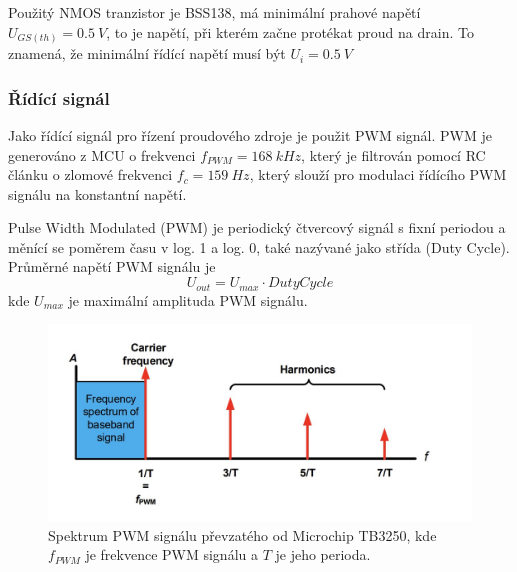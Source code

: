 Použitý NMOS tranzistor je BSS138, má minimální prahové napětí $U_{GS(th)} = 0.5 \ V$, to je napětí, při kterém začne protékat proud na drain. To znamená, že minimální řídící napětí musí být $U_{i} = 0.5 \ V$


\subsubsection{Řídící signál}
Jako řídící signál pro řízení proudového zdroje je použit PWM signál. PWM je generováno z MCU o frekvenci $f_{PWM} = 168 \ kHz$, který je filtrován pomocí RC článku o zlomové frekvenci $f_c = 159 \ Hz$, který slouží pro modulaci řídícího PWM signálu na konstantní napětí.
\par
Pulse Width Modulated (PWM) je periodický čtvercový signál s fixní periodou a měnící se poměrem času v log. 1 a log. 0, také nazývané jako střída (Duty Cycle). Průměrné napětí PWM signálu je
\begin{equation}
    U_{out} = U_{max} \cdot Duty Cycle
\end{equation}
kde $U_{max}$ je maximální amplituda PWM signálu. \par

\begin{figure}[H]
    \centering
    \includegraphics[width=1\linewidth]{pictures/pwm_spectrum_microchip90003250A.jpg}
    \caption{Spektrum PWM signálu převzatého od Microchip TB3250, kde $f_{PWM}$ je frekvence PWM signálu a $T$ je jeho perioda. \cite{cite:MCPPWV}}
    \label{fig:pwm_spectrum}
\end{figure}



